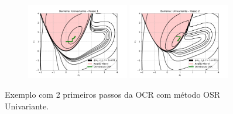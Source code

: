 \documentclass[10pt, a4paper]{article}
\begin{document}
\begin{figure}[H]
  \centering
  \begin{subfigure}[b]{\textwidth}
    \includegraphics[width=0.49\textwidth]{fig_p1/Barreira_Univariante_1.pdf}
    \includegraphics[width=0.49\textwidth]{fig_p1/Barreira_Univariante_2.pdf}
  \end{subfigure}
  \caption{Exemplo com 2 primeiros passos da OCR com método OSR Univariante. }
\end{figure}
\end{document}
